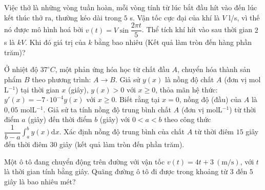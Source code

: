\begin{bt}%
	Việc thở là những vòng tuần hoàn, mỗi vòng tính từ lúc bắt đầu hít vào đến lúc kết thúc  thở ra, thường kéo dài trong $5$ s. Vận tốc cực đại của khí là $V$ l/s, vì thế nó được mô hình hoá bởi $v(t)=V \sin\dfrac{2\pi t}{5}$. Thể tích khí hít vào sau thời gian $2$ s là $kV$. Khi đó giá trị của $k$ bằng bao nhiêu (Kết quả làm tròn đến hàng phần trăm)?
\end{bt}

\begin{bt}%
	Ở nhiệt độ $37^\circ C$, một phản ứng hóa học từ chất đầu $A$, chuyển hóa thành sản phẩm $B$ theo phương trình: $A\to B$. Giả sử $y(x)$ là nồng độ chất $A$ (đơn vị mol L$^{-1}$) tại  thời gian $x$ (giây), $y(x)>0$ với $x\geq 0$, thỏa mãn hệ thức: $y'(x)=-7\cdot 10^{-4}y(x)$ với $x\geq 0$. Biết rằng tại $x=0$, nồng độ (đầu) của $A$ là $0{,}05$ molL$^{-1}$. Giả sử ta tính nồng độ trung bình chất $A$ (đơn vị molL$^{-1}$) từ thời điểm $a$ (giây) đến thời điểm $b$ (giây) với $0<a<b$ theo công thức $\dfrac{1}{b-a}\displaystyle\int_{a}^{b}y(x)\mathrm{d}x$. Xác định nồng độ trung bình của chất $A$ từ thời điêm $15$ giây đến thời điêm $30$ giây (kết quả làm tròn đến phần trăm).
\end{bt}

\begin{bt}%
	Một ô tô đang chuyển  động trên đường với vận tốc $v(t)=4t+3~(\text{m/s})$, với $t$ là thời gian tính bằng giây. Quãng đường ô tô đi được trong khoảng từ $3$ đến $5$ giây là bao nhiêu mét?
\end{bt}

